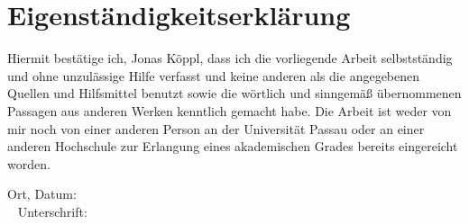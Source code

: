 \chapter*{Eigenständigkeitserklärung}

Hiermit bestätige ich, Jonas Köppl, dass ich die
vorliegende Arbeit selbstständig und ohne unzulässige Hilfe verfasst und keine
anderen als die angegebenen Quellen und Hilfsmittel benutzt sowie die wörtlich und
sinngemäß übernommenen Passagen aus anderen Werken kenntlich gemacht habe.
Die Arbeit ist weder von mir noch von einer anderen Person an der Universität
Passau oder an einer anderen Hochschule zur Erlangung eines akademischen
Grades bereits eingereicht worden.\\

\begin{flushleft}
Ort, Datum:\\\
\newline 
Unterschrift:
\end{flushleft}